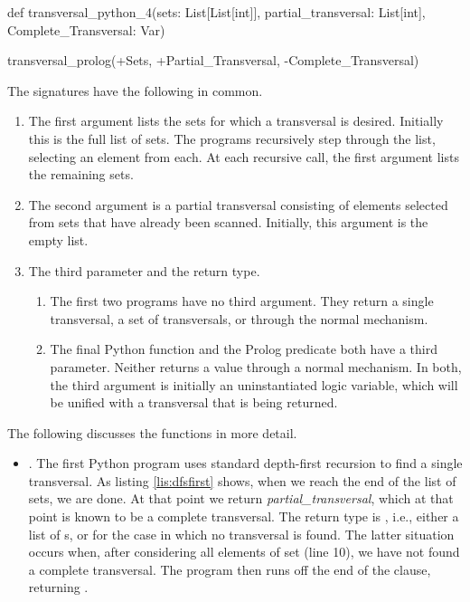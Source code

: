 \begin{sloppypar}
\begin{python}
def transversal_python_4(sets: List[List[int]], 
                         partial_transversal: List[int],
                         Complete_Transversal: Var)
\end{python}

\begin{python}
    transversal_prolog(+Sets, 
                       +Partial_Transversal, 
                       -Complete_Transversal)
\end{python}

The signatures have the following in common. 
\begin{enumerate}
\item The first argument lists the sets for which a transversal is desired. Initially this is the full list of sets. The programs recursively step through the list, selecting an element from each. At each recursive call, the first argument lists the remaining sets. 

\item The second argument is a partial transversal consisting of elements selected from sets that have already been scanned. Initially, this argument is the empty list.

\item The third parameter and the return type.
\begin{enumerate}
\item The first two programs have no third argument. They return a single transversal, a set of transversals, or  through the normal  mechanism.

\item The final Python function and the Prolog predicate both have a third parameter. Neither returns a value through a normal  mechanism. In both, the third argument is initially an uninstantiated logic variable, which will be unified with a transversal that is being returned.
\end{enumerate}
\end{enumerate}
The following discusses the functions in more detail.
\begin{itemize}[label=$\bullet$]
\item {}. The first Python program uses standard depth-first recursion to find a single transversal. As listing \ref{lis:dfsfirst} shows, when we reach the end of the list of sets, we are done. At that point we return  \textit{partial\_transversal}, which at that point is known to be a complete transversal. The return type is , i.e., either a list of s, or  for the case in which no transversal is found. The latter situation occurs when, after considering all elements of set (line 10), we have not found a complete transversal. The program then runs off the end of the  clause, returning .


\end{itemize}
\end{sloppypar}
